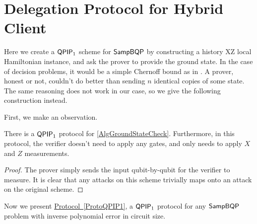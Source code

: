 \section{Delegation Protocol for Hybrid Client}

Here we create a $\operatorname{\mathsf{QPIP}}_1$ scheme for $\operatorname{\mathsf{SampBQP}}$ by constructing a history XZ local Hamiltonian instance, and ask the prover to provide the ground state. In the case of decision problems, it would be a simple Chernoff bound as in \cite{kitaev2002classical}. A prover, honest or not, couldn't do better than sending $n$ identical copies of some state. The same reasoning does not work in our case, so we give the following construction instead.

First, we make an observation.

\begin{lemma}
	\label{ProtoGroundStateCheck}
	There is a $\operatorname{\mathsf{QPIP}}_1$ protocol for \autoref{AlgGroundStateCheck}. Furthermore, in this protocol, the verifier doesn't need to apply any gates, and only needs to apply $X$ and $Z$ measurements.
\end{lemma}
\begin{proof}
	The prover simply sends the input qubit-by-qubit for the verifier to measure. It is clear that any attacks on this scheme trivially maps onto an attack on the original scheme.
\end{proof}

Now we present \hyperref[ProtoQPIP1]{Protocol~\ref*{ProtoQPIP1}}, a $\operatorname{\mathsf{QPIP}}_1$ protocol for any $\operatorname{\mathsf{SampBQP}}$ problem with inverse polynomial error in circuit size.

